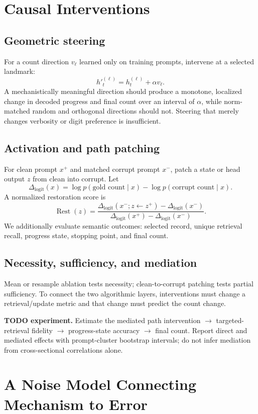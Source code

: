 \documentclass[10pt,twocolumn]{article}
\newcommand{\todoexp}[1]{%
  \par\noindent\textcolor{red!75!black}{\textbf{TODO experiment.} #1}\par}
\begin{document}
\section{Causal Interventions}
\subsection{Geometric steering}
For a count direction $v_\ell$ learned only on training prompts, intervene at a selected landmark:
\[
    h'^{(\ell)}_t=h^{(\ell)}_t+\alpha v_\ell.
\]
A mechanistically meaningful direction should produce a monotone, localized change in decoded
progress and final count over an interval of $\alpha$, while norm-matched random and orthogonal
directions should not. Steering that merely changes verbosity or digit preference is insufficient.

\subsection{Activation and path patching}
For clean prompt $x^+$ and matched corrupt prompt $x^-$, patch a state or head output
$z$ from clean into corrupt. Let
\[
 \Delta_{\mathrm{logit}}(x)
 =\log p(\text{gold count}\mid x)
 -\log p(\text{corrupt count}\mid x).
\]
A normalized restoration score is
\[
 \operatorname{Rest}(z)=
 \frac{\Delta_{\mathrm{logit}}(x^-;z\leftarrow z^+)
       -\Delta_{\mathrm{logit}}(x^-)}
      {\Delta_{\mathrm{logit}}(x^+)-\Delta_{\mathrm{logit}}(x^-)}.
\]
We additionally evaluate semantic outcomes: selected record, unique retrieval recall, progress
state, stopping point, and final count.

\subsection{Necessity, sufficiency, and mediation}
Mean or resample ablation tests necessity; clean-to-corrupt patching tests partial sufficiency.
To connect the two algorithmic layers, interventions must change a retrieval/update metric and
that change must predict the count change.

\todoexp{Estimate the mediated path
intervention $\rightarrow$ targeted-retrieval fidelity $\rightarrow$ progress-state accuracy
$\rightarrow$ final count. Report direct and mediated effects with prompt-cluster bootstrap
intervals; do not infer mediation from cross-sectional correlations alone.}

\section{A Noise Model Connecting Mechanism to Error}
\end{document}
